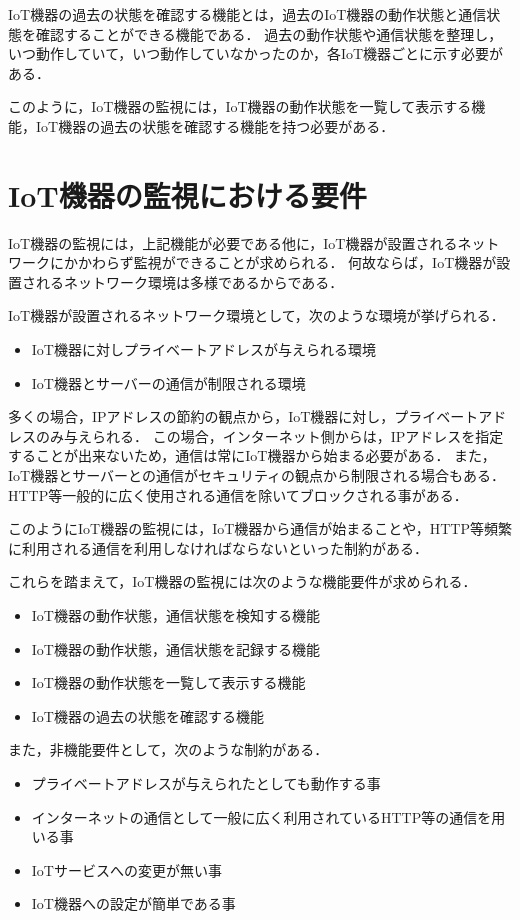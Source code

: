 IoT機器の過去の状態を確認する機能とは，過去のIoT機器の動作状態と通信状態を確認することができる機能である．
過去の動作状態や通信状態を整理し，いつ動作していて，いつ動作していなかったのか，各IoT機器ごとに示す必要がある．
\medskip

このように，IoT機器の監視には，IoT機器の動作状態を一覧して表示する機能，IoT機器の過去の状態を確認する機能を持つ必要がある．

\section{IoT機器の監視における要件}%
IoT機器の監視には，上記機能が必要である他に，IoT機器が設置されるネットワークにかかわらず監視ができることが求められる．
何故ならば，IoT機器が設置されるネットワーク環境は多様であるからである．
\medskip

IoT機器が設置されるネットワーク環境として，次のような環境が挙げられる．
\begin{itemize}
	\item IoT機器に対しプライベートアドレスが与えられる環境
	\item IoT機器とサーバーの通信が制限される環境
\end{itemize}

多くの場合，IPアドレスの節約の観点から，IoT機器に対し，プライベートアドレスのみ与えられる．
この場合，インターネット側からは，IPアドレスを指定することが出来ないため，通信は常にIoT機器から始まる必要がある．
また，IoT機器とサーバーとの通信がセキュリティの観点から制限される場合もある．
HTTP等一般的に広く使用される通信を除いてブロックされる事がある．
\medskip

このようにIoT機器の監視には，IoT機器から通信が始まることや，HTTP等頻繁に利用される通信を利用しなければならないといった制約がある．


これらを踏まえて，IoT機器の監視には次のような機能要件が求められる．
\begin{itemize}
	\item IoT機器の動作状態，通信状態を検知する機能
	\item IoT機器の動作状態，通信状態を記録する機能
	\item IoT機器の動作状態を一覧して表示する機能
	\item IoT機器の過去の状態を確認する機能
\end{itemize}
また，非機能要件として，次のような制約がある．
\begin{itemize}
	\item プライベートアドレスが与えられたとしても動作する事
	\item インターネットの通信として一般に広く利用されているHTTP等の通信を用いる事
	\item IoTサービスへの変更が無い事
	\item IoT機器への設定が簡単である事
\end{itemize}

